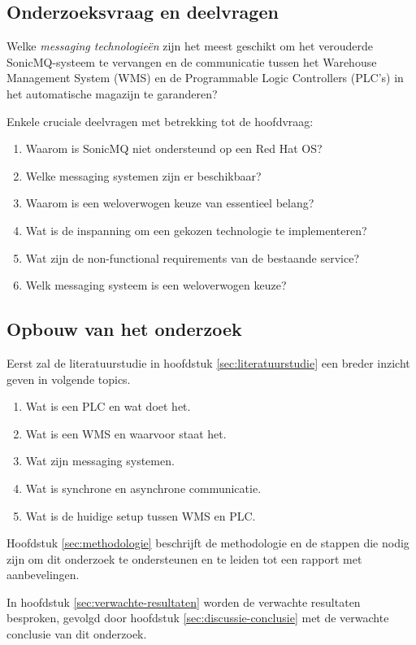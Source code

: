 \newpage

\subsection{Onderzoeksvraag en deelvragen}
Welke \emph{messaging technologieën} zijn het meest geschikt om het verouderde SonicMQ-systeem te vervangen 
en de communicatie tussen het Warehouse Management System (WMS) en de Programmable Logic Controllers (PLC’s) 
in het automatische magazijn te garanderen?

Enkele cruciale deelvragen met betrekking tot de hoofdvraag:
\begin{enumerate}
  \item Waarom is SonicMQ niet ondersteund op een Red Hat OS?
  \item Welke messaging systemen zijn er beschikbaar?
  \item Waarom is een weloverwogen keuze van essentieel belang?
  \item Wat is de inspanning om een gekozen technologie te implementeren?
  \item Wat zijn de non-functional requirements van de bestaande service?
  \item Welk messaging systeem is een weloverwogen keuze?
\end{enumerate}

\subsection{Opbouw van het onderzoek}
Eerst zal de literatuurstudie in hoofdstuk \ref{sec:literatuurstudie} een breder inzicht geven in volgende topics.
\begin{enumerate}
  \item Wat is een PLC en wat doet het.
  \item Wat is een WMS en waarvoor staat het.
  \item Wat zijn messaging systemen.
  \item Wat is synchrone en asynchrone communicatie. 
  \item Wat is de huidige setup tussen WMS en PLC.
\end{enumerate}

Hoofdstuk \ref{sec:methodologie} beschrijft de methodologie en de stappen die nodig zijn om dit onderzoek te ondersteunen
en te leiden tot een rapport met aanbevelingen.
\newline

In hoofdstuk \ref{sec:verwachte-resultaten} worden de verwachte resultaten besproken, gevolgd door 
hoofdstuk \ref{sec:discussie-conclusie} met de verwachte conclusie van dit onderzoek.


